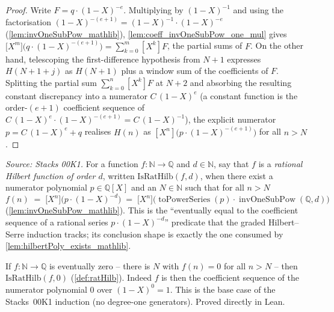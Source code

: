 \begin{proof}
  \leanok
  Write \(F = q\cdot(1-X)^{-e}\). Multiplying by
  \((1-X)^{-1}\) and using the factorisation
  \((1-X)^{-(e+1)} = (1-X)^{-1}\cdot(1-X)^{-e}\)
  (\cref{lem:invOneSubPow_mathlib}), \cref{lem:coeff_invOneSubPow_one_mul} gives
  \(\bigl[X^m\bigr]\bigl(q\cdot(1-X)^{-(e+1)}\bigr) = \sum_{k=0}^{m}[X^k]F\), the
  partial sums of \(F\). On the other hand, telescoping the first-difference
  hypothesis from \(N+1\) expresses \(H(N+1+j)\) as \(H(N+1)\) plus a window sum
  of the coefficients of \(F\). Splitting the partial sum
  \(\sum_{k=0}^{n}[X^k]F\) at \(N+2\) and absorbing the resulting constant
  discrepancy into a numerator \(C\,(1-X)^{e}\) (a constant function is the
  order-\((e+1)\) coefficient sequence of \(C\,(1-X)^{e}\cdot(1-X)^{-(e+1)} =
  C\,(1-X)^{-1}\)), the explicit numerator
  \(p = C\,(1-X)^{e} + q\) realises \(H(n)\) as
  \([X^n]\bigl(p\cdot(1-X)^{-(e+1)}\bigr)\) for all \(n > N\).
\end{proof}

\begin{definition}\leanok
  \label{def:ratHilb}
  \textit{Source: Stacks 00K1.}
  For a function \(f : \mathbb{N} \to \mathbb{Q}\) and \(d \in \mathbb{N}\), say
  that \(f\) is a \emph{rational Hilbert function of order \(d\)}, written
  \(\mathrm{IsRatHilb}(f, d)\), when there exist a numerator polynomial
  \(p \in \mathbb{Q}[X]\) and an \(N \in \mathbb{N}\) such that for all \(n > N\)
  \[
    f(n) \;=\; \bigl[X^n\bigr]\bigl(p\cdot(1-X)^{-d}\bigr)
    \;=\; \bigl[X^n\bigr]\bigl(\operatorname{toPowerSeries}(p)\cdot
      \operatorname{invOneSubPow}(\mathbb{Q}, d)\bigr)
  \]
  (\cref{lem:invOneSubPow_mathlib}). This is the ``eventually equal to the
  coefficient sequence of a rational series \(p\cdot(1-X)^{-d}\)'' predicate that
  the graded Hilbert--Serre induction tracks; its conclusion shape is exactly the
  one consumed by \cref{lem:hilbertPoly_exists_mathlib}.
\end{definition}

\begin{lemma}\leanok
  \label{lem:ratHilb_ofEventuallyZero}
  If \(f : \mathbb{N} \to \mathbb{Q}\) is eventually zero -- there is
  \(N\) with \(f(n) = 0\) for all \(n > N\) -- then \(\mathrm{IsRatHilb}(f, 0)\)
  (\cref{def:ratHilb}). Indeed \(f\) is then the coefficient sequence of the
  numerator polynomial \(0\) over \((1-X)^{0} = 1\). This is the base case of the
  Stacks~00K1 induction (no degree-one generators). Proved directly in Lean.
\end{lemma}

